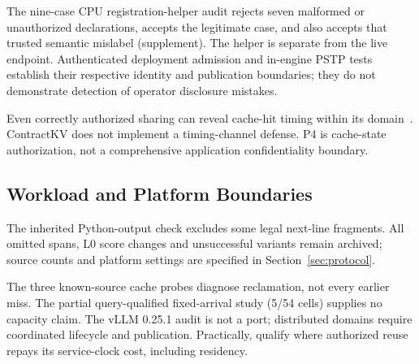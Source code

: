 The nine-case CPU registration-helper audit rejects seven malformed or unauthorized declarations, accepts the legitimate case, and also accepts that trusted semantic mislabel (supplement). The helper is separate from the live endpoint. Authenticated deployment admission and in-engine PSTP tests establish their respective identity and publication boundaries; they do not demonstrate detection of operator disclosure mistakes.

Even correctly authorized sharing can reveal cache-hit timing within its domain~\cite{iknow2025,auditing2025}. ContractKV does not implement a timing-channel defense. P4 is cache-state authorization, not a comprehensive application confidentiality boundary.

\subsection{Workload and Platform Boundaries}
The inherited Python-output check excludes some legal next-line fragments. All omitted spans, L0 score changes and unsuccessful variants remain archived; source counts and platform settings are specified in Section~\ref{sec:protocol}.

The three known-source cache probes diagnose reclamation, not every earlier miss. The partial query-qualified fixed-arrival study (5/54 cells) supplies no capacity claim. The vLLM 0.25.1 audit is not a port; distributed domains require coordinated lifecycle and publication. Practically, qualify where authorized reuse repays its service-clock cost, including residency.
